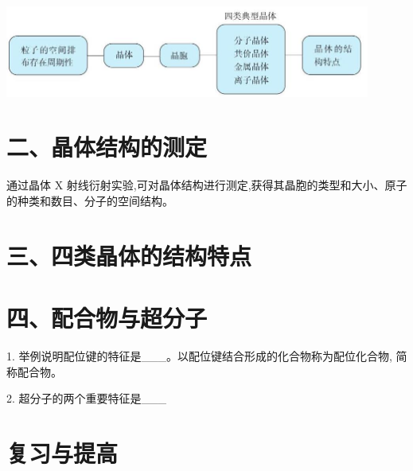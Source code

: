 \documentclass[10pt]{article}
\begin{document}
\begin{center}
\includegraphics[max width=0.9\textwidth]{images/0190e026-5a11-7df7-bd27-54d09026ba7a_104_321594.jpg}
\end{center}

\section*{二、晶体结构的测定}

通过晶体 \(\mathrm{X}\) 射线衍射实验,可对晶体结构进行测定,获得其晶胞的类型和大小、原子的种类和数目、分子的空间结构。

\section*{三、四类晶体的结构特点}

\begin{center}
\end{center}

\section*{四、配合物与超分子}

1. 举例说明配位键的特征是\_\_\_。以配位键结合形成的化合物称为配位化合物, 简称配合物。

2. 超分子的两个重要特征是\_\_\_

\section*{复习与提高}
\end{document}

